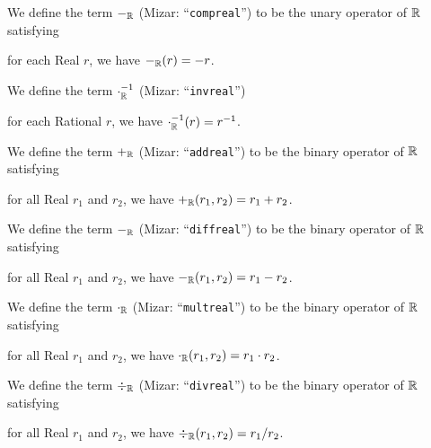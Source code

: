 \documentclass{article}
\begin{document}
\begin{definition}
We define the term $-_{\mathbb{R}}$ (Mizar: ``\verb#compreal#'') to be the unary
operator of $\mathbb{R}$ satisfying
\begin{defn}
\item for each Real $r$, we have $-_{\mathbb{R}}(r)=-r$.
\end{defn}
We define the term $\cdot^{-1}_{\mathbb{R}}$ (Mizar: ``\verb#invreal#'')
\begin{defn}
\item for each Rational $r$, we have $\cdot^{-1}_{\mathbb{R}}(r)=r^{-1}$.
\end{defn}
We define the term $+_{\mathbb{R}}$ (Mizar: ``\verb#addreal#'') to be the
binary operator of $\mathbb{R}$ satisfying
\begin{defn}
\item for all Real $r_{1}$ and $r_{2}$, we have $+_{\mathbb{R}}(r_{1},r_{2})=r_{1}+r_{2}$.
\end{defn}
We define the term $-_{\mathbb{R}}$ (Mizar: ``\verb#diffreal#'') to be the
binary operator of $\mathbb{R}$ satisfying
\begin{defn}
\item for all Real $r_{1}$ and $r_{2}$, we have $-_{\mathbb{R}}(r_{1},r_{2})=r_{1}-r_{2}$.
\end{defn}
We define the term $\cdot_{\mathbb{R}}$ (Mizar: ``\verb#multreal#'') to be
the binary operator of $\mathbb{R}$ satisfying
\begin{defn}
\item for all Real $r_{1}$ and $r_{2}$, we have $\cdot_{\mathbb{R}}(r_{1},r_{2})=r_{1}\cdot r_{2}$.
\end{defn}
We define the term $\div_{\mathbb{R}}$ (Mizar: ``\verb#divreal#'') to be
the binary operator of $\mathbb{R}$ satisfying
\begin{defn}
\item for all Real $r_{1}$ and $r_{2}$, we have $\div_{\mathbb{R}}(r_{1},r_{2})=r_{1}/r_{2}$.
\end{defn}
\end{definition}
\end{document}
